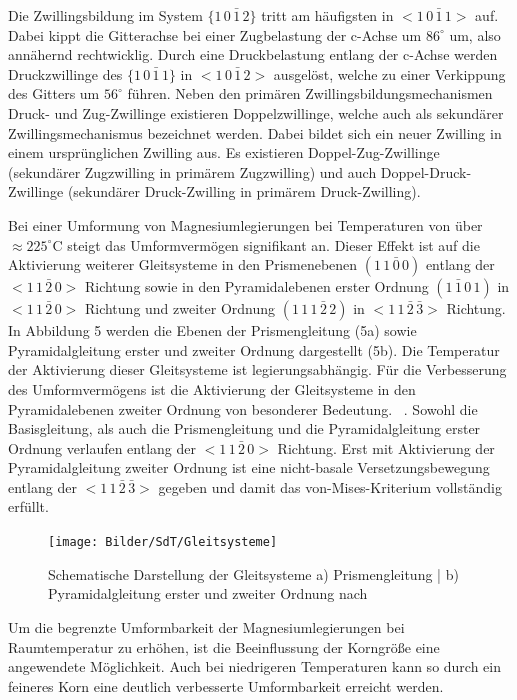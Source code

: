 Die Zwillingsbildung im System $\{1\,0\,\bar{1}\,2\}$ tritt am häufigsten in $<1\,0\,\bar{1}\,1>$ auf.
Dabei kippt die Gitterachse bei einer Zugbelastung der c-Achse um $86^\circ$ um, also annähernd rechtwicklig.
Durch eine Druckbelastung entlang der c-Achse werden Druckzwillinge des $\{1\,0\,\bar{1}\,1\}$ in $<1\,0\,\bar{1}\,2>$ ausgelöst, welche zu einer Verkippung des Gitters um $56^\circ$ führen.
Neben den primären Zwillingsbildungsmechanismen Druck- und Zug-Zwillinge existieren Doppelzwillinge, welche auch als sekundärer Zwillingsmechanismus bezeichnet werden.
Dabei bildet sich ein neuer Zwilling in einem ursprünglichen Zwilling aus.
Es existieren Doppel-Zug-Zwillinge (sekundärer Zugzwilling in primärem Zugzwilling) und auch Doppel-Druck-Zwillinge (sekundärer Druck-Zwilling in primärem Druck-Zwilling). \cite{Ullmann.2014}

Bei einer Umformung von Magnesiumlegierungen bei Temperaturen von über $\approx 225 ^\circ\text{C}$ steigt das Umformvermögen signifikant an.
Dieser Effekt ist auf die Aktivierung weiterer Gleitsysteme in den Prismenebenen $(1\,\bar{1\,0\,0})$ entlang der $<1\,1\,\bar{2}\,0>$ Richtung sowie in den Pyramidalebenen erster Ordnung $(1\,\bar{1}\,0\,1)$ in $<1\,1\,\bar{2}\,0>$ Richtung und zweiter Ordnung $(1\,1\,1\,\bar{2}\,2)$ in $<1\,1\,\bar{2}\,\bar{3}>$ Richtung.
In Abbildung 5 werden die Ebenen der Prismengleitung (5a) sowie Pyramidalgleitung erster und zweiter Ordnung dargestellt (5b).
Die Temperatur der Aktivierung dieser Gleitsysteme ist legierungsabhängig. \cite{Kammer.2000}
Für die Verbesserung des Umformvermögens ist die Aktivierung der Gleitsysteme in den Pyramidalebenen zweiter Ordnung von besonderer Bedeutung. \cite{En.2001,Doege.2010}~.
Sowohl die Basisgleitung, als auch die Prismengleitung und die Pyramidalgleitung erster Ordnung verlaufen entlang der $<1\,1\,\bar{2}\,0>$ Richtung.
Erst mit Aktivierung der Pyramidalgleitung zweiter Ordnung ist eine nicht-basale Versetzungsbewegung entlang der $<1\,1\,\bar{2}\,\bar{3}>$ gegeben und damit das von-Mises-Kriterium vollständig erfüllt. \cite{Schmidt.2011}

\begin{figure}[H]%
    \centering
    \texttt{[image: Bilder/SdT/Gleitsysteme]}
    \caption[Gleitsysteme]{Schematische Darstellung der Gleitsysteme a) Prismengleitung | b) Pyramidalgleitung erster und zweiter Ordnung nach \cite{Kammer.2000}}
    \label{fig:pyramidal}
\end{figure}

Um die begrenzte Umformbarkeit der Magnesiumlegierungen bei Raumtemperatur zu erhöhen, ist die Beeinflussung der Korngröße eine angewendete Möglichkeit.
Auch bei niedrigeren Temperaturen kann so durch ein feineres Korn eine deutlich verbesserte Umformbarkeit erreicht werden. \cite{Tripathi.2017}

